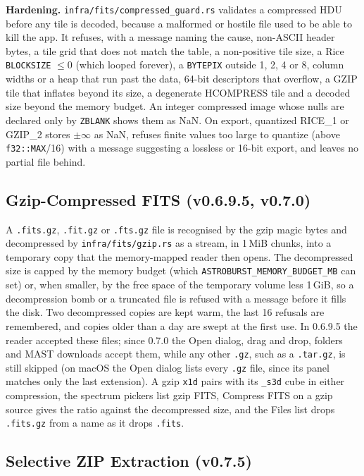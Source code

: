 \documentclass[11pt,a4paper]{article}
\newcommand{\code}[1]{\texttt{\small #1}}
\begin{document}
    \textbf{Hardening.} \code{infra/fits/compressed\_guard.rs} validates a compressed HDU before any tile is decoded, because a malformed or hostile file used to be able to kill the app. It refuses, with a message naming the cause, non-ASCII header bytes, a tile grid that does not match the table, a non-positive tile size, a Rice \code{BLOCKSIZE} $\le 0$ (which looped forever), a \code{BYTEPIX} outside 1, 2, 4 or 8, column widths or a heap that run past the data, 64-bit descriptors that overflow, a GZIP tile that inflates beyond its size, a degenerate HCOMPRESS tile and a decoded size beyond the memory budget. An integer compressed image whose nulls are declared only by \code{ZBLANK} shows them as NaN. On export, quantized RICE\_1 or GZIP\_2 stores $\pm\infty$ as NaN, refuses finite values too large to quantize (above \code{f32::MAX}/16) with a message suggesting a lossless or 16-bit export, and leaves no partial file behind.

    \subsection{Gzip-Compressed FITS (v0.6.9.5, v0.7.0)}

    A \code{.fits.gz}, \code{.fit.gz} or \code{.fts.gz} file is recognised by the gzip magic bytes and decompressed by \code{infra/fits/gzip.rs} as a stream, in 1\,MiB chunks, into a temporary copy that the memory-mapped reader then opens. The decompressed size is capped by the memory budget (which \code{ASTROBURST\_MEMORY\_BUDGET\_MB} can set) or, when smaller, by the free space of the temporary volume less 1\,GiB, so a decompression bomb or a truncated file is refused with a message before it fills the disk. Two decompressed copies are kept warm, the last 16 refusals are remembered, and copies older than a day are swept at the first use. In 0.6.9.5 the reader accepted these files; since 0.7.0 the Open dialog, drag and drop, folders and MAST downloads accept them, while any other \code{.gz}, such as a \code{.tar.gz}, is still skipped (on macOS the Open dialog lists every \code{.gz} file, since its panel matches only the last extension). A gzip \code{x1d} pairs with its \code{\_s3d} cube in either compression, the spectrum pickers list gzip FITS, Compress FITS on a gzip source gives the ratio against the decompressed size, and the Files list drops \code{.fits.gz} from a name as it drops \code{.fits}.

    \subsection{Selective ZIP Extraction (v0.7.5)}
\end{document}
